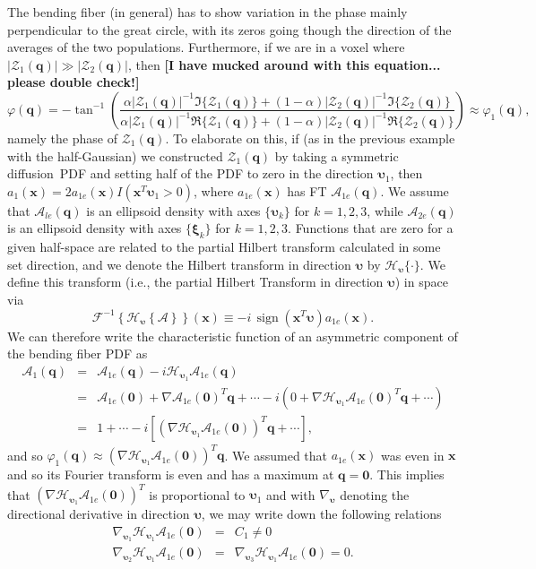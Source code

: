 \documentclass[authoryear,preprint,12pt]{elsarticle}
\DeclareMathOperator*{\sign}{sign}
\newcommand{\q}{\mathbf{q}}
\newcommand{\bsu}{\bs{\upsilon}}
\newcommand{\x}{\mathbf{x}}
\newcommand{\cA}{\mathcal{A}}
\newcommand{\cF}{\mathcal{F}}
\newcommand{\cH}{\mathcal{H}}
\newcommand{\cZ}{\mathcal{Z}}
\newcommand{\bld}[1]{\mathbf{#1}}
\newcommand{\bs}[1]{\boldsymbol{#1}}
\begin{document}
The bending fiber (in general) has to show variation in the phase
mainly perpendicular to the great circle, with its zeros going though
the direction of the averages of the two populations.  Furthermore, if
we are in a voxel where $|\cZ_1(\q)|\gg|\cZ_2(\q)|$, then \textbf{[I
    have mucked around with this equation... please double check!]}
\begin{equation}
  \varphi(\q) = -\tan^{-1} \left(\frac{\alpha |\cZ_1(\q)|^{-1}
    \Im\{\cZ_1(\q)\} + (1-\alpha) |\cZ_2(\q)|^{-1} \Im\{\cZ_2(\q)\}}
         {\alpha |\cZ_1(\q)|^{-1} \Re\{\cZ_1(\q)\} + (1-\alpha)
           |\cZ_2(\q)|^{-1} \Re\{\cZ_2(\q)\}} \right) \approx
         \varphi_1(\q),
\end{equation}
namely the phase of $\cZ_1(\q)$.  To elaborate on this, if (as in the
previous example with the half-Gaussian) we constructed $\cZ_1(\q)$ by
taking a symmetric diffusion~PDF and setting half of the PDF to zero
in the direction $\bsu_1$, then $a_1(\x)=2a_{1e}(\x)I(\x^T\bsu_1>0)$,
where $ a_{1e}(\x)$ has FT $\cA_{1e}(\q)$.  We assume that
$\cA_{le}(\q)$ is an ellipsoid density with axes $\{\bsu_k\}$ for
$k=1,2,3$, while $\cA_{2e}(\q)$ is an ellipsoid density with axes
$\{\bs{\xi}_k\}$ for $k=1,2,3$.  Functions that are zero for a given
half-space are related to the partial Hilbert transform
\citep{Granlund} calculated in some set direction, and we denote the
Hilbert transform in direction $\bsu$ by $\cH_{\bsu}\{\cdot\}$.  We
define this transform (i.e., the partial Hilbert Transform in
direction $\bsu$) in space via
\begin{equation}
  \cF^{-1}\left\{\cH_{\bsu}\left\{\cA\right\}\right\}(\x) \equiv -i \,
  \sign\left(\x^T\bsu\right)a_{1e}(\x).
\end{equation}
We can therefore write the characteristic function of an asymmetric
component of the bending fiber PDF as
\begin{eqnarray}
  \cA_1(\q) &=& \cA_{1e}(\q) - i \cH_{\bsu_1}\cA_{1e}(\q) \nonumber\\
  &=& \cA_{1e}(\bld{0})+\nabla \cA_{1e}(\bld{0})^T\q + \cdots - i
  \left(0 + \nabla\cH_{\bsu_1}\cA_{1e}(\bld{0})^T\q + \cdots\right) \nonumber\\
  &=& 1 + \cdots - i
  \left[\left(\nabla\cH_{\bsu_1}\cA_{1e}(\bld{0})\right)^T\q +
  \cdots\right],
\end{eqnarray}
and so
$\varphi_1(\q)\approx(\nabla\cH_{\bsu_1}\cA_{1e}(\bld{0}))^T\q$.  We
assumed that $a_{1e}(\x)$ was even in $\x$ and so its Fourier
transform is even and has a maximum at $\q=\bld{0}$.  This implies
that $(\nabla\cH_{\bsu_1}\cA_{1e}(\bld{0}))^T$ is proportional to
$\bsu_1$ and with $\nabla_{\bsu}$ denoting the directional derivative
in direction $\bsu$, we may write down the following relations
\begin{eqnarray}
  \nabla_{\bsu_1}\cH_{\bsu_1}\cA_{1e}(\bld{0}) &=& C_1 \neq 0\\
  \nabla_{\bsu_2}\cH_{\bsu_1}\cA_{1e}(\bld{0}) &=& \nabla_{\bsu_3}
  \cH_{\bsu_1}\cA_{1e}(\bld{0}) = 0.
\end{eqnarray}
\end{document}
